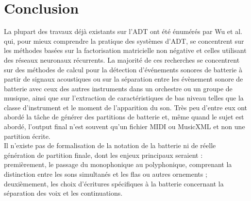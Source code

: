 \section*{Conclusion}
La plupart des travaux déjà existants sur l’ADT ont été énumérés par Wu et al.\cite{Review_ADT} qui, pour mieux comprendre la pratique des systèmes d’ADT, se concentrent sur les méthodes basées sur la factorisation matricielle non négative et celles utilisant des réseaux neuronaux récurrents. La majorité de ces recherches se concentrent sur des méthodes de calcul pour la détection d'événements sonores de batterie à partir de signaux acoustiques ou sur la séparation entre les évènement sonore de batterie avec ceux des autres instruments dans un orchestre ou un groupe de musique\cite{2802}, ainsi que sur l'extraction de caractéristiques de bas niveau telles que la classe d'instrument et le moment de l'apparition du son. Très peu d'entre eux ont abordé la tâche de générer des partitions de batterie et, même quand le sujet est abordé, l’output final n’est souvent qu’un fichier MIDI ou MusicXML et non une partition écrite.\\
Il n’existe pas de formalisation de la notation de la batterie ni de réelle génération de partition finale, dont les enjeux principaux seraient :\\ premièrement, le passage du monophonique au polyphonique, comprenant la distinction entre les sons simultanés et les flas ou autres ornements ; deuxièmement, les choix d’écritures spécifiques à la batterie concernant la séparation des voix et les continuations.